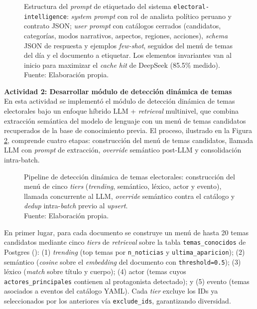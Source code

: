 \begin{figure}[!ht]
    \begin{center}
        \resizebox{0.85\textwidth}{!}{}
        \caption[Estructura del prompt de etiquetado del sistema electoral-intelligence]{Estructura del \textit{prompt} de etiquetado del sistema \texttt{electoral-intelligence}: \textit{system prompt} con rol de analista político peruano y contrato JSON; \textit{user prompt} con catálogos cerrados (candidatos, categorías, modos narrativos, aspectos, regiones, acciones), \textit{schema} JSON de respuesta y ejemplos \textit{few-shot}, seguidos del menú de temas del día y el documento a etiquetar. Los elementos invariantes van al inicio para maximizar el \textit{cache hit} de DeepSeek (85.5\% medido).\\
            Fuente: Elaboración propia.}
        \label{5:fig17}
    \end{center}
\end{figure}

\textbf{Actividad 2: Desarrollar módulo de detección dinámica de temas}
\\
En esta actividad se implementó el módulo de detección dinámica de temas
electorales bajo un enfoque híbrido LLM + \textit{retrieval} multinivel, que
combina extracción semántica del modelo de lenguaje con un menú de temas
candidatos recuperados de la base de conocimiento previa. El proceso, ilustrado
en la Figura \ref{5:fig18}, comprende cuatro etapas: construcción del menú de
temas candidatos, llamada LLM con \textit{prompt} de extracción, \textit{override}
semántico post-LLM y consolidación intra-batch.

\begin{figure}[!ht]
    \begin{center}
        \resizebox{0.85\textwidth}{!}{}
        \caption[Pipeline de detección dinámica de temas con LLM y retrieval multinivel]{Pipeline de detección dinámica de temas electorales: construcción del menú de cinco \textit{tiers} (\textit{trending}, semántico, léxico, actor y evento), llamada concurrente al LLM, \textit{override} semántico contra el catálogo y \textit{dedup} intra-\textit{batch} previo al \textit{upsert}.\\
            Fuente: Elaboración propia.}
        \label{5:fig18}
    \end{center}
\end{figure}

En primer lugar, para cada documento se construye un menú de hasta 20 temas
candidatos mediante cinco \textit{tiers} de \textit{retrieval} sobre la tabla
\texttt{temas\_conocidos} de Postgres
(): (1) \textit{trending} (top
temas por \texttt{n\_noticias} y \texttt{ultima\_aparicion}); (2) semántico
(\textit{cosine} sobre el \textit{embedding} del documento con \texttt{threshold=0.5});
(3) léxico (\textit{match} sobre título y cuerpo); (4) actor (temas cuyos
\texttt{actores\_principales} contienen al protagonista detectado); y (5) evento
(temas asociados a eventos del catálogo YAML). Cada \textit{tier} excluye los IDs
ya seleccionados por los anteriores vía \texttt{exclude\_ids}, garantizando
diversidad.

